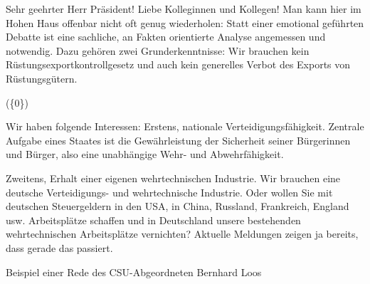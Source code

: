 \begin{example}[H]
    Sehr geehrter Herr Präsident! Liebe Kolleginnen und Kollegen! Man kann hier im Hohen Haus offenbar nicht oft genug wiederholen: Statt einer emotional geführten Debatte ist eine sachliche, an Fakten orientierte Analyse angemessen und notwendig. Dazu gehören zwei Grunderkenntnisse: Wir brauchen kein Rüstungsexportkontrollgesetz und auch kein generelles Verbot des Exports von Rüstungsgütern.

    (\{0\})
    
    Wir haben folgende Interessen: Erstens, nationale Verteidigungsfähigkeit. Zentrale Aufgabe eines Staates ist die Gewährleistung der Sicherheit seiner Bürgerinnen und Bürger, also eine unabhängige Wehr- und Abwehrfähigkeit.
    
    Zweitens, Erhalt einer eigenen wehrtechnischen Industrie. Wir brauchen eine deutsche Verteidigungs- und wehrtechnische Industrie. Oder wollen Sie mit deutschen Steuergeldern in den USA, in China, Russland, Frankreich, England usw. Arbeitsplätze schaffen und in Deutschland unsere bestehenden wehrtechnischen Arbeitsplätze vernichten? Aktuelle Meldungen zeigen ja bereits, dass gerade das passiert.
    \caption{Beispiel einer Rede des \acs{CSU}-Abgeordneten Bernhard Loos \autocite{richter_open_2021}} \label{list:exampleSpeechCsu}
\end{example}

